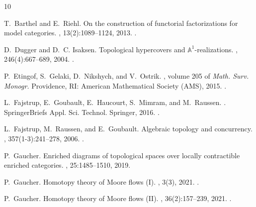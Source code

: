 \documentclass[12pt,a4paper]{amsart}
\theoremstyle{definition}
\begin{document}
\begin{thebibliography}{10}
	
	T.~Barthel and E.~Riehl.
	\newblock On the construction of functorial factorizations for model
	categories.
	, 13(2):1089--1124, 2013.
	\newblock \href {https://doi.org/10.2140/agt.2013.13.1089}
	{}.
	
	D.~Dugger and D.~C. Isaksen.
	\newblock Topological hypercovers and {\(\mathbb A^1\)}-realizations.
	, 246(4):667--689, 2004.
	\newblock \href {https://doi.org/10.1007/s00209-003-0607-y}
	{}.
	
	P.~Etingof, S.~Gelaki, D.~Nikshych, and V.~Ostrik.
	, volume 205 of {\em Math. Surv. Monogr.}
	\newblock Providence, RI: American Mathematical Society (AMS), 2015.
	\newblock \href {https://doi.org/10.1090/surv/205}
	{}.
	
	L.~Fajstrup, E.~Goubault, E.~Haucourt, S.~Mimram, and M.~Raussen.
	.
	\newblock SpringerBriefs Appl. Sci. Technol. Springer, 2016.
	\newblock \href {https://doi.org/10.1007/978-3-319-15398-8}
	{}.
	
	L.~Fajstrup, M.~Raussen, and E.~Goubault.
	\newblock Algebraic topology and concurrency.
	, 357(1-3):241--278, 2006.
	\newblock \href {https://doi.org/10.1016/j.tcs.2006.03.022}
	{}.
	
	P.~Gaucher.
	\newblock Enriched diagrams of topological spaces over locally contractible
	enriched categories.
	, 25:1485--1510, 2019.
	
	P.~Gaucher.
	\newblock Homotopy theory of {M}oore flows ({I}).
	, 3(3), 2021.
	\newblock \href {https://doi.org/10.32408/compositionality-3-3}
	{}.
	
	P.~Gaucher.
	\newblock Homotopy theory of {M}oore flows ({II}).
	, 36(2):157--239, 2021.
	\newblock \href {https://doi.org/10.17398/2605-5686.36.2.157}
	{}.
	

\end{thebibliography}
\end{document}
